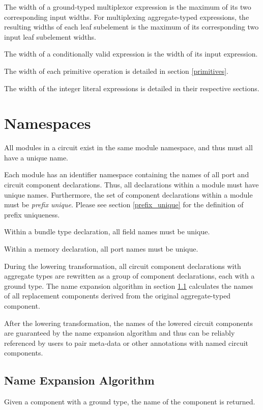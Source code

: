 \documentclass[12pt]{article}
\begin{document}
The width of a ground-typed multiplexor expression is the maximum of its two corresponding input widths. For multiplexing aggregate-typed expressions, the resulting widths of each leaf subelement is the maximum of its corresponding two input leaf subelement widths.

The width of a conditionally valid expression is the width of its input expression.

The width of each primitive operation is detailed in section \ref{primitives}.

The width of the integer literal expressions is detailed in their respective sections.

\section{Namespaces}

All modules in a circuit exist in the same module namespace, and thus must all have a unique name.

Each module has an identifier namespace containing the names of all port and circuit component declarations. Thus, all declarations within a module must have unique names. Furthermore, the set of component declarations within a module must be {\em prefix unique}. Please see section \ref{prefix_unique} for the definition of prefix uniqueness.

Within a bundle type declaration, all field names must be unique.

Within a memory declaration, all port names must be unique.

During the lowering transformation, all circuit component declarations with aggregate types are rewritten as a group of component declarations, each with a ground type. The name expansion algorithm in section \ref{expansion_algorithm} calculates the names of all replacement components derived from the original aggregate-typed component.

After the lowering transformation, the names of the lowered circuit components are guaranteed by the name expansion algorithm and thus can be reliably referenced by users to pair meta-data or other annotations with named circuit components.

\subsection{Name Expansion Algorithm} \label{expansion_algorithm}

Given a component with a ground type, the name of the component is returned.
\end{document}
